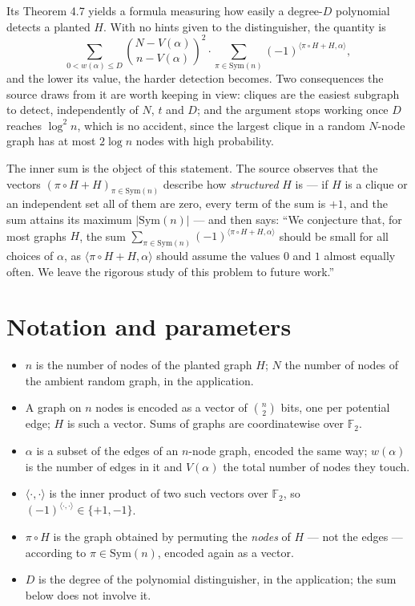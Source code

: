 \documentclass{aicr-conjecture}
\newcommand{\Sym}{\mathrm{Sym}}
\newcommand{\wt}{w}
\newcommand{\V}{V}
\begin{document}
Its Theorem 4.7 yields a formula measuring how easily a degree-$D$
polynomial detects a planted $H$. With no hints given to the
distinguisher, the quantity is
\[
  \sum_{0 < \wt(\alpha) \le D}
  \binom{N - \V(\alpha)}{n - \V(\alpha)}^{2} \cdot
  \sum_{\pi \in \Sym(n)} (-1)^{\langle \pi \circ H + H, \alpha \rangle},
\]
and the lower its value, the harder detection becomes. Two consequences
the source draws from it are worth keeping in view: cliques are the
easiest subgraph to detect, independently of $N$, $t$ and $D$; and the
argument stops working once $D$ reaches $\log^{2} n$, which is no
accident, since the largest clique in a random $N$-node graph has at most
$2\log n$ nodes with high probability.

The inner sum is the object of this statement. The source observes that
the vectors $(\pi \circ H + H)_{\pi \in \Sym(n)}$ describe how
\emph{structured} $H$ is --- if $H$ is a clique or an independent set all
of them are zero, every term of the sum is $+1$, and the sum attains its
maximum $|\Sym(n)|$ --- and then says: ``We conjecture that, for most graphs $H$,
the sum $\sum_{\pi \in \Sym(n)} (-1)^{\langle \pi \circ H + H, \alpha
\rangle}$ should be small for all choices of $\alpha$, as $\langle \pi
\circ H + H, \alpha \rangle$ should assume the values $0$ and $1$ almost
equally often. We leave the rigorous study of this problem to future
work.''

\section{Notation and parameters}\label{sec:notation}

\begin{itemize}[nosep]
  \item $n$ is the number of nodes of the planted graph $H$; $N$ the
    number of nodes of the ambient random graph, in the application.
  \item A graph on $n$ nodes is encoded as a vector of $\binom{n}{2}$
    bits, one per potential edge; $H$ is such a vector. Sums of graphs
    are coordinatewise over $\mathbb{F}_{2}$.
  \item $\alpha$ is a subset of the edges of an $n$-node graph, encoded
    the same way; $\wt(\alpha)$ is the number of edges in it and
    $\V(\alpha)$ the total number of nodes they touch.
  \item $\langle \cdot, \cdot \rangle$ is the inner product of two such
    vectors over $\mathbb{F}_{2}$, so $(-1)^{\langle \cdot, \cdot
    \rangle} \in \{+1,-1\}$.
  \item $\pi \circ H$ is the graph obtained by permuting the
    \emph{nodes} of $H$ --- not the edges --- according to $\pi \in
    \Sym(n)$, encoded again as a vector.
  \item $D$ is the degree of the polynomial distinguisher, in the
    application; the sum below does not involve it.
\end{itemize}
\end{document}
